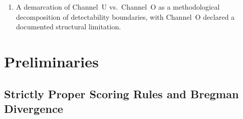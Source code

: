 \documentclass[runningheads]{llncs}
\newcommand{\Hnull}{H_0^{\text{stat}}}
\begin{document}
\begin{enumerate}
          empirically-calibrated anytime-valid threshold $c_A^*$ equal
          to the per-category $(1-\alpha)$-empirical-quantile of
          $\sup_t M_t$ over cal-factual traces in each category $c$,
          and (iii)~a single-stop critical value $c^*$ calibrated to
          $\mathbb{P}(M_{T_i}\!\ge\!c^*)\!=\!\alpha$ at each trace's
          natural terminal. Denoting the three alarms by Arm~A,
          Arm~$A'$, and Arm~B for thresholds $1/\alpha$, $c_A^*$, and
          $c^*$ respectively (precise definitions in
          Remark~\ref{rem:theorem1-scope}), by the per-category
          structural ordering $c^* \leq c_A^* \leq 1/\alpha$ (where
          $c^* \leq c_A^*$ follows from $\sup_t M_t \geq M_{T_i}$
          pointwise dominance on the same category-$c$ cal-factual
          sample, and $c_A^* \leq 1/\alpha$ follows from Ville's
          inequality under $\Hnull$;
          see Remark~\ref{rem:theorem1-scope}), the threshold
          magnitudes are jointly determined by both the
          calibration-target choice (sup-over-trajectory vs.\
          terminal-only) and the anytime-valid property; we therefore
          report the resulting FAR gaps as joint characterizations
          rather than as isolated attribution to any single property.
          By construction, whenever the peek set $K$ includes each
          trace's natural terminal time $T_i$ (the convention we adopt
          throughout), the lower bound $\text{FAR}_B(K) \geq \alpha$
          holds (Arm B's threshold $c^*$ is calibrated to alarm at rate
          $\alpha$ at $T_i$). Monotonicity
          $K' \supseteq K \Rightarrow \text{FAR}_B(K') \geq
          \text{FAR}_B(K)$ holds by set inclusion without
          distributional assumption.
    \item A demarcation of Channel~U vs.\ Channel~O as a methodological
          decomposition of detectability boundaries, with Channel~O
          declared a documented structural limitation.
\end{enumerate}

\section{Preliminaries}

\subsection{Strictly Proper Scoring Rules and Bregman Divergence}
\end{document}
